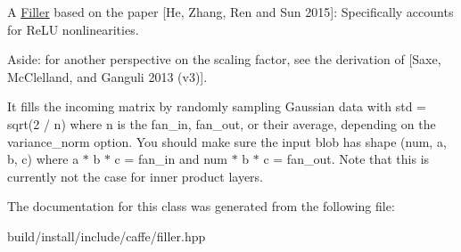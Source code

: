 A \mbox{\hyperlink{classcaffe_1_1_filler}{Filler}} based on the paper \mbox{[}He, Zhang, Ren and Sun 2015\mbox{]}\+: Specifically accounts for Re\+LU nonlinearities.

Aside\+: for another perspective on the scaling factor, see the derivation of \mbox{[}Saxe, Mc\+Clelland, and Ganguli 2013 (v3)\mbox{]}.

It fills the incoming matrix by randomly sampling Gaussian data with std = sqrt(2 / n) where n is the fan\+\_\+in, fan\+\_\+out, or their average, depending on the variance\+\_\+norm option. You should make sure the input blob has shape (num, a, b, c) where a $\ast$ b $\ast$ c = fan\+\_\+in and num $\ast$ b $\ast$ c = fan\+\_\+out. Note that this is currently not the case for inner product layers. 

The documentation for this class was generated from the following file\+:\begin{DoxyCompactItemize}
\item 
build/install/include/caffe/filler.\+hpp\end{DoxyCompactItemize}
